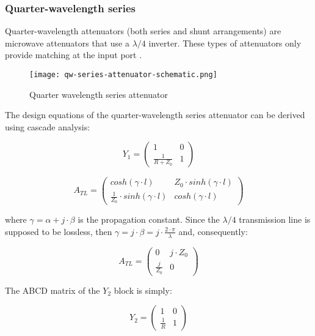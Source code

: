 \subsubsection{Quarter-wavelength series}

\noindent Quarter-wavelength attenuators (both series and shunt arrangements) are microwave attenuators that use a $\lambda/4$ inverter. These types of attenuators only provide matching at the input port \cite{pin_diode_designer_handbook}.

\begin{figure}[ht]
    \centering
    \texttt{[image: qw-series-attenuator-schematic.png]}
    \caption{Quarter wavelength series attenuator}
    \label{fig:qw-series-attenuator-schematic}
\end{figure}

\noindent The design equations of the quarter-wavelength series attenuator can be derived using cascade analysis:

\begin{equation}
    Y_1 = \begin{pmatrix}
        1 & 0\\
        \frac{1}{R + Z_0} & 1
    \end{pmatrix}
\end{equation}

\begin{equation}
    A_{TL} = \begin{pmatrix}
        cosh(\gamma \cdot l) & Z_0 \cdot sinh(\gamma \cdot l)\\
        \frac{1}{Z_0} \cdot sinh(\gamma \cdot l)  & cosh(\gamma \cdot l)
    \end{pmatrix}
\end{equation}

\noindent where $\gamma = \alpha + j \cdot \beta$ is the propagation constant. Since the $\lambda/4$ transmission line is supposed to be lossless, then $\gamma = j \cdot \beta = j \cdot \frac{2 \cdot \pi}{\lambda}$ and, consequently:

\begin{equation}
    A_{TL} = \begin{pmatrix}
        0 & j \cdot Z_0\\
        \frac{j}{Z_0}  & 0
    \end{pmatrix}
\end{equation}

\noindent The ABCD matrix of the $Y_2$ block is simply:

\begin{equation}
    Y_{2} = \begin{pmatrix}
        1 & 0\\
        \frac{1}{R}  & 1
    \end{pmatrix}
\end{equation}

